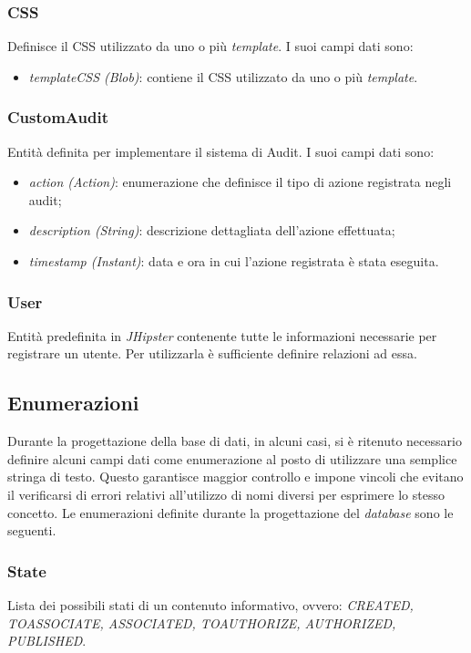 \subsubsection{CSS}
Definisce il CSS utilizzato da uno o più \textit{template}. I suoi campi dati sono:
\begin{itemize}
    \item \textit{templateCSS (Blob)}: contiene il CSS utilizzato da uno o più \textit{template}.
\end{itemize}

\subsubsection{CustomAudit}
Entità definita per implementare il sistema di Audit. I suoi campi dati sono:
\begin{itemize}
    \item \textit{action (Action)}: enumerazione che definisce il tipo di azione registrata negli audit;
    \item \textit{description (String)}: descrizione dettagliata dell'azione effettuata;
    \item \textit{timestamp (Instant)}: data e ora in cui l'azione registrata è stata eseguita.
\end{itemize}

\subsubsection{User}
Entità predefinita in \textit{JHipster} contenente tutte le informazioni necessarie per registrare un utente. Per utilizzarla è sufficiente definire relazioni ad essa.

\subsection{Enumerazioni}
Durante la progettazione della base di dati, in alcuni casi, si è ritenuto necessario definire alcuni campi dati come enumerazione al posto di utilizzare una semplice stringa di testo.
Questo garantisce maggior controllo e impone vincoli che evitano il verificarsi di errori relativi all'utilizzo di nomi diversi per esprimere lo stesso concetto. Le enumerazioni definite durante la progettazione del \textit{database} sono le seguenti.

\subsubsection{State}
Lista dei possibili stati di un contenuto informativo, ovvero: \textit{CREATED, TO\textunderscore{}ASSOCIATE, ASSOCIATED, TO\textunderscore{}AUTHORIZE, AUTHORIZED, PUBLISHED}.

